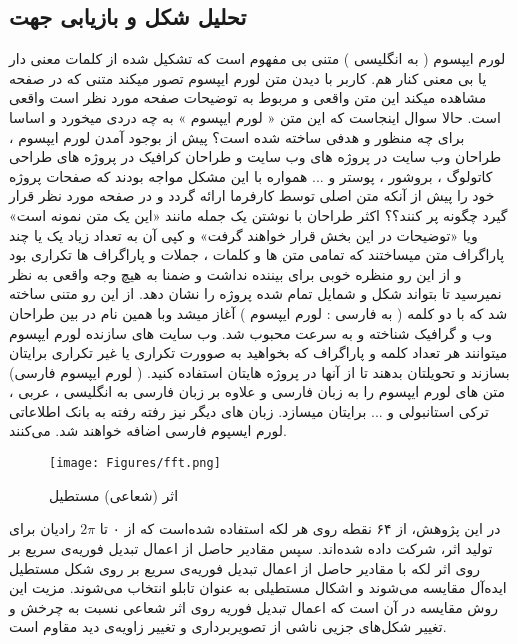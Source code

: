 \documentclass[oneside,openany,mscS]{SBU-Thesis}
\begin{document}
	\subsection{تحلیل شکل و بازیابی جهت}
	
	لورم ایپسوم ( به انگلیسی  ) متنی بی مفهوم است که تشکیل شده از کلمات معنی دار یا بی معنی کنار هم. کاربر با دیدن متن لورم ایپسوم تصور میکند متنی که در صفحه مشاهده میکند این متن واقعی و مربوط به توضیحات صفحه مورد نظر است واقعی است. حالا سوال اینجاست که این متن « لورم ایپسوم » به چه دردی میخورد و اساسا برای چه منظور و هدفی ساخته شده است؟ پیش از بوجود آمدن لورم ایپسوم ، طراحان وب سایت در پروژه های وب سایت و طراحان کرافیک در پروژه های طراحی کاتولوگ ، بروشور ، پوستر و ... همواره با این مشکل مواجه بودند که صفحات پروژه خود را پیش از آنکه متن اصلی توسط کارفرما ارائه گردد و در صفحه مورد نظر قرار گیرد چگونه پر کنند؟؟ اکثر طراحان با نوشتن یک جمله مانند «این یک متن نمونه است» ویا «توضیحات در این بخش قرار خواهند گرفت» و کپی آن به تعداد زیاد یک یا چند پاراگراف متن میساختند که تمامی متن ها و کلمات ، جملات و پاراگراف ها تکراری بود و از این رو منظره خوبی برای بیننده نداشت و ضمنا به هیچ وجه واقعی به نظر نمیرسید تا بتواند شکل و شمایل تمام شده پروژه را نشان دهد. از این رو متنی ساخته شد که با دو کلمه ( به فارسی : لورم ایپسوم ) آغاز میشد وبا همین نام در بین طراحان وب و گرافیک شناخته و به سرعت محبوب شد. وب سایت های سازنده لورم ایپسوم میتوانند هر تعداد کلمه و پاراگراف که بخواهید به صوورت تکراری یا غیر تکراری برایتان بسازند و تحویلتان بدهند تا از آنها در پروژه هایتان استفاده کنید. ( لورم ایپسوم فارسی) متن های لورم ایپسوم را به زبان فارسی و علاوه بر زبان فارسی به انگلیسی ، عربی ، ترکی استانبولی و ... برایتان میسازد. زبان های دیگر نیز رفته رفته به بانک اطلاعاتی لورم ایسپوم فارسی اضافه خواهند شد.  
	می‌کنند. 
	\begin{figure}[t]
		\centering
		\texttt{[image: Figures/fft.png]}
		\caption[اثر (شعاعی) مستطیل]{اثر (شعاعی) مستطیل \cite{reina2006adaptive}}
		\label{fig:fft}
	\end{figure}
	در این پژوهش، از ۶۴ نقطه روی هر لکه استفاده شده‌است که از ۰ تا $2\pi$ رادیان برای تولید اثر، شرکت داده شده‌اند. سپس مقادیر حاصل از اعمال تبدیل فوریه‌ی سریع بر روی اثر لکه با مقادیر حاصل از اعمال تبدیل فوریه‌ی سریع بر روی شکل مستطیل ایده‌آل مقایسه می‌شوند و اشکال مستطیلی به عنوان تابلو انتخاب می‌شوند. مزیت این روش مقایسه در آن است که اعمال تبدیل فوریه روی اثر شعاعی نسبت به چرخش و تغییر شکل‌های جزیی ناشی از تصویربرداری و تغییر زاویه‌ی دید مقاوم است. 
\end{document}
